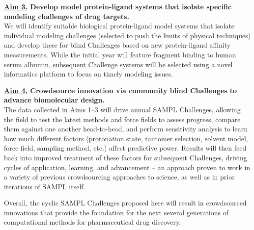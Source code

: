 \documentclass[11pt]{article}
\begin{document}
{\bf \underline{Aim 3.} Develop model protein-ligand systems that isolate specific modeling challenges of drug targets.}\\
We will identify suitable biological protein-ligand model systems that isolate individual modeling challenges (selected to push the limits of physical techniques) and develop these for blind Challenges based on new protein-ligand affinity measurements.
While the initial year will feature fragment binding to human serum albumin, subsequent Challenge systems will be selected using a novel informatics platform to focus on timely modeling issues.

{\bf \underline{Aim 4.} Crowdsource innovation via community blind Challenges to advance biomolecular design.} \\
The data collected in Aims 1--3 will drive annual SAMPL Challenges, allowing the field to test the latest methods and force fields to assess progress, compare them against one another head-to-head, and perform sensitivity analysis to learn how much different factors (protonation state, tautomer selection, solvent model, force field, sampling method, etc.) affect predictive power. 
Results will then feed back into improved treatment of these factors for subsequent Challenges, driving cycles of application, learning, and advancement -- an approach proven to work in a variety of previous crowdsourcing approaches to science, as well as in prior iterations of SAMPL itself.

Overall, the cyclic SAMPL Challenges proposed here will result in crowdsourced innovations that provide the foundation for the next several generations of computational methods for pharmaceutical drug discovery. 



\end{document}
